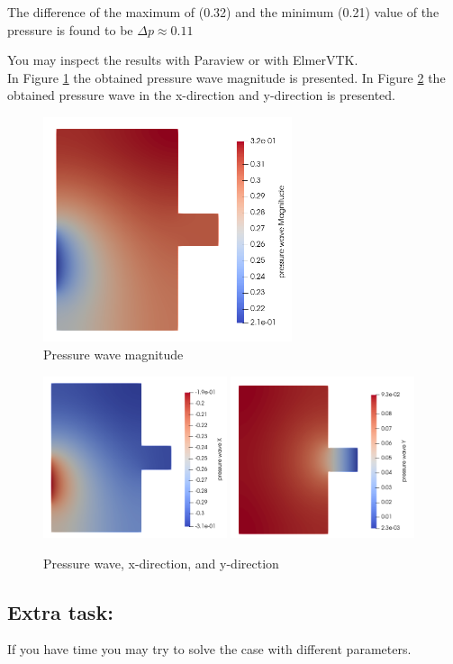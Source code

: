 The difference of the maximum of (0.32) and the minimum (0.21) value of the pressure is found to be $\Delta p \approx 0.11$

You may inspect the results with Paraview or with ElmerVTK.\\

In Figure \ref{fg:press-mag} the obtained pressure wave magnitude is presented.  In Figure \ref{fg:press-xy} the obtained pressure wave in the x-direction and y-direction is presented. 

\begin{figure}[H]
\centering
\includegraphics[width=0.65\textwidth]{press-mag}
\caption{Pressure wave magnitude}\label{fg:press-mag}
\end{figure} 

\begin{figure}[H]
\centering
\includegraphics[width=0.48\textwidth]{press-x}
\includegraphics[width=0.48\textwidth]{press-y}
\caption{Pressure wave, x-direction, and y-direction}\label{fg:press-xy}
\end{figure} 

\subsection*{Extra task:}

If you have time you may try to solve the case with different parameters.

\hfill
